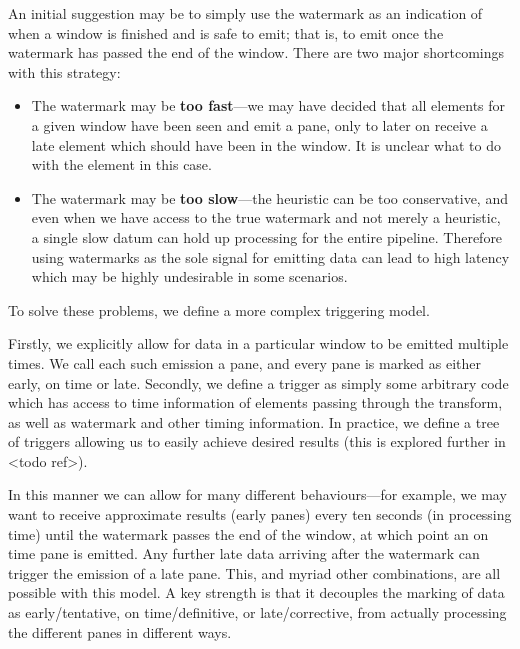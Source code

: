 An initial suggestion may be to simply use the watermark as an indication of when a window is finished and is safe to emit; that is, to emit once the watermark has passed the end of the window.
There are two major shortcomings with this strategy:
\begin{itemize}
	\item The watermark may be \textbf{too fast}---we may have decided that all elements for a given window have been seen and emit a pane, only to later on receive a late element which should have been in the window.
	It is unclear what to do with the element in this case.
	
	\item The watermark may be \textbf{too slow}---the heuristic can be too conservative, and even when we have access to the true watermark and not merely a heuristic, a single slow datum can hold up processing for the entire pipeline.
	Therefore using watermarks as the sole signal for emitting data can lead to high latency which may be highly undesirable in some scenarios.
\end{itemize} 

To solve these problems, we define a more complex triggering model.

Firstly, we explicitly allow for data in a particular window to be emitted multiple times.
We call each such emission a pane, and every pane is marked as either early, on time or late.
Secondly, we define a trigger as simply some arbitrary code which has access to time information of elements passing through the transform, as well as watermark and other timing information.
In practice, we define a tree of triggers allowing us to easily achieve desired results (this is explored further in <todo ref>). 

In this manner we can allow for many different behaviours---for example, we may want to receive approximate results (early panes) every ten seconds (in processing time) until the watermark passes the end of the window, at which point an on time pane is emitted.
Any further late data arriving after the watermark can trigger the emission of a late pane.
This, and myriad other combinations, are all possible with this model.
A key strength is that it decouples the marking of data as early/tentative, on time/definitive, or late/corrective, from actually processing the different panes in different ways.


